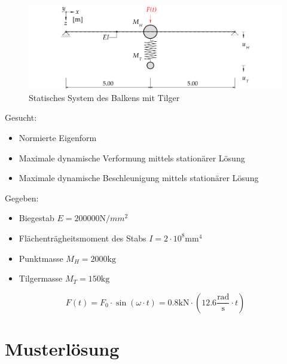 \documentclass[
  letterpaper,
  DIV=11]{scrreprt}
\providecommand{\tightlist}{%
  \setlength{\itemsep}{0pt}\setlength{\parskip}{0pt}}\usepackage{longtable,booktabs,array}
\begin{document}
\begin{figure}[H]

{\centering \includegraphics{index_files/mediabag/bilder/aufgabe_mms_tilg_system.pdf}

}

\caption{\label{fig-mms_tilg_tilger}Statisches System des Balkens mit
Tilger}

\end{figure}

Gesucht:

\begin{itemize}
\tightlist
\item
  Normierte Eigenform
\item
  Maximale dynamische Verformung mittels stationärer Lösung
\item
  Maximale dynamische Beschleunigung mittels stationärer Lösung
\end{itemize}

Gegeben:

\begin{itemize}
\tightlist
\item
  Biegestab \(E = 200000 \text{N}/{mm}^2\)
\item
  Flächenträgheitsmoment des Stabs \(I = 2 \cdot 10^8 \text{mm}^4\)
\item
  Punktmasse \(M_H = 2000 \text{kg}\)
\item
  Tilgermasse \(M_T = 150 \text{kg}\)
\end{itemize}

\[
F(t) = F_0 \cdot \sin(\omega\cdot t) = 0.8 \text{kN} \cdot (12.6 \frac{\text{rad}}{\text{s}}\cdot t)
\]

\newpage{}

\hypertarget{musterluxf6sung-9}{%
\section{Musterlösung}\label{musterluxf6sung-9}}
\end{document}
